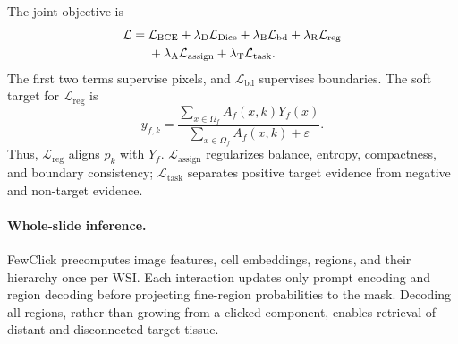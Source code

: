 \documentclass[letterpaper]{article}
\begin{document}
The joint objective is
\begin{align}
\mathcal{L}={}&\mathcal{L}_{\mathrm{BCE}}
+\lambda_{\mathrm{D}}\mathcal{L}_{\mathrm{Dice}}
+\lambda_{\mathrm{B}}\mathcal{L}_{\mathrm{bd}}
+\lambda_{\mathrm{R}}\mathcal{L}_{\mathrm{reg}} \notag\\
&+\lambda_{\mathrm{A}}\mathcal{L}_{\mathrm{assign}}
+\lambda_{\mathrm{T}}\mathcal{L}_{\mathrm{task}}.
\label{eq:loss}
\end{align}
The first two terms supervise pixels, and $\mathcal{L}_{\mathrm{bd}}$ supervises boundaries. The soft target for $\mathcal{L}_{\mathrm{reg}}$ is
\begin{equation}
y_{f,k}=
\frac{\sum_{x\in\Omega_f}A_f(x,k)Y_f(x)}
{\sum_{x\in\Omega_f}A_f(x,k)+\varepsilon}.
\label{eq:region-target}
\end{equation}
Thus, $\mathcal{L}_{\mathrm{reg}}$ aligns $p_k$ with $Y_f$. $\mathcal{L}_{\mathrm{assign}}$ regularizes balance, entropy, compactness, and boundary consistency; $\mathcal{L}_{\mathrm{task}}$ separates positive target evidence from negative and non-target evidence.

\paragraph{Whole-slide inference.}
FewClick precomputes image features, cell embeddings, regions, and their hierarchy once per WSI. Each interaction updates only prompt encoding and region decoding before projecting fine-region probabilities to the mask. Decoding all regions, rather than growing from a clicked component, enables retrieval of distant and disconnected target tissue.
\end{document}
